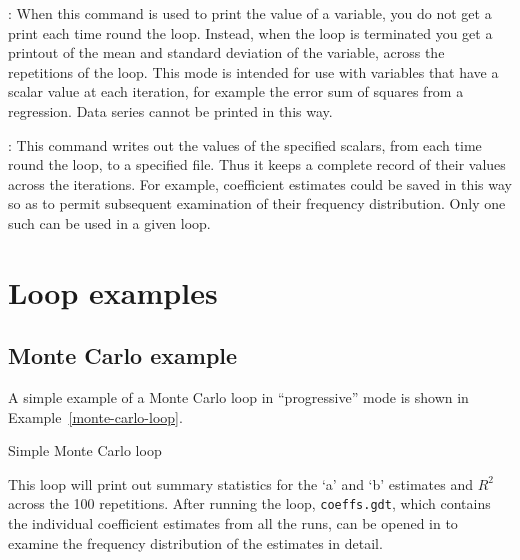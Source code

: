 : When this command is used to print the value of a
variable, you do not get a print each time round the loop.  Instead,
when the loop is terminated you get a printout of the mean and
standard deviation of the variable, across the repetitions of the
loop.  This mode is intended for use with variables that have a scalar
value at each iteration, for example the error sum of squares from a
regression.  Data series cannot be printed in this way.

: This command writes out the values of the specified
scalars, from each time round the loop, to a specified file.  Thus it
keeps a complete record of their values across the iterations.  For
example, coefficient estimates could be saved in this way so as to
permit subsequent examination of their frequency distribution.  Only
one such  can be used in a given loop.

\section{Loop examples}
\label{loop-examples}


\subsection{Monte Carlo example}
\label{loop-mc-example}

A simple example of a Monte Carlo loop in ``progressive'' mode is
shown in Example~\ref{monte-carlo-loop}.

\begin{script}[htbp]
  \caption{Simple Monte Carlo loop}
  \label{monte-carlo-loop}
\end{script}

This loop will print out summary statistics for the `a' and `b'
estimates and $R^2$ across the 100 repetitions.  After running the
loop, \verb+coeffs.gdt+, which contains the individual coefficient
estimates from all the runs, can be opened in  to examine
the frequency distribution of the estimates in detail.

